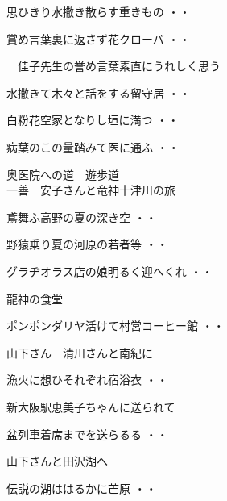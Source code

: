 \begin{shiika}思ひきり水撒き散らす重きもの
\hfill{・・}\end{shiika}
\begin{shiika}賞め言葉裏に返さず花クローバ
\hfill{・・}\end{shiika}
\qquad\qquad\qquad　佳子先生の誉め言葉素直にうれしく思う
\begin{shiika}水撒きて木々と話をする留守居
\hfill{・・}\end{shiika}
\begin{shiika}白粉花空家となりし垣に満つ
\hfill{・・}\end{shiika}
\begin{shiika}病葉のこの量踏みて医に通ふ
\hfill{・・}\end{shiika}
\qquad\qquad\qquad 奥医院への道　遊歩道\\
\vspace{0.4cm}
\noindent
一善　安子さんと竜神十津川の旅
\begin{shiika}鳶舞ふ高野の夏の深き空
\hfill{・・}\end{shiika}
\begin{shiika}野猿乗り夏の河原の若者等
\hfill{・・}\end{shiika}
\begin{shiika}グラヂオラス店の娘明るく迎へくれ
\hfill{・・}\end{shiika}
\qquad\qquad\qquad 龍神の食堂\\
\begin{shiika}ポンポンダリヤ活けて村営コーヒー館
\hfill{・・}\end{shiika}
\vspace{0.4cm}
山下さん　清川さんと南紀に
\begin{shiika}漁火に想ひそれぞれ宿浴衣
\hfill{・・}\end{shiika}
\vspace{0.4cm}
新大阪駅恵美子ちゃんに送られて
\begin{shiika}盆列車着席までを送らるる
\hfill{・・}\end{shiika}
\vspace{0.4cm}
山下さんと田沢湖へ
\begin{shiika}伝説の湖ははるかに芒原
\hfill{・・}\end{shiika}
